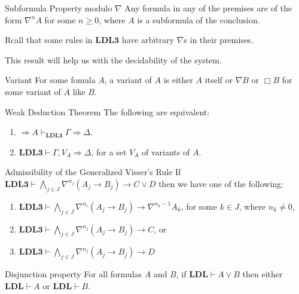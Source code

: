\documentclass[handout]{beamer}
\begin{document}
\begin{frame}{\subResults}
	\begin{exampleblock}{Subformula Property modulo $\nabla$}
		Any formula in any of the premises are of the form $\nabla^n A$ for some $n \geq 0$, where $A$ is a subformula of the conclusion.
	\end{exampleblock}
	\vspace{15mm}
	Rcall that some rules in $\mathbf{LDL3}$ have arbitrary $\nabla$s in their premises.
	
	This result will help us with the decidability of the system.
\end{frame}

\begin{frame}{\subResults}
	\begin{block}{Variant}
		For some fomula $A$, a variant of $A$ is either $A$ itself or $\nabla B$ or $\Box B$ for some variant of $A$ like $B$.
	\end{block}
	\begin{exampleblock}{Weak Deduction Theorem}
		The following are equivalent:
		\begin{enumerate}
			\item $\Rightarrow A \vdash_\mathbf{LDL3} \Gamma \Rightarrow \Delta$.
			\item $\mathbf{LDL3} \vdash \Gamma, V_A \Rightarrow \Delta$, for a set $V_A$ of variants of $A$.
		\end{enumerate}
	\end{exampleblock}
\end{frame}

\begin{frame}{\subResults}
	\begin{exampleblock}{Admissibility of the Generalized Visser's Rule}
		If $\mathbf{LDL3} \vdash \bigwedge_{j \in J} \nabla^{n_j} (A_j \rightarrow B_j) \rightarrow C \vee D$ then we have one of the following:
    \begin{enumerate}
      \item $\mathbf{LDL3} \vdash \bigwedge_{j \in J} \nabla^{n_i} (A_j \rightarrow B_j) \rightarrow \nabla^{n_k - 1} A_k$, {\small for some $k \in J$, where $n_k \neq 0$},
      \item $\mathbf{LDL3} \vdash \bigwedge_{j \in J} \nabla^{n_j} (A_j \rightarrow B_j) \rightarrow C$, or
      \item $\mathbf{LDL3} \vdash \bigwedge_{j \in J} \nabla^{n_j} (A_j \rightarrow B_j) \rightarrow D$
    \end{enumerate}
	\end{exampleblock}
	\begin{exampleblock}{Disjunction property}
		For all formulas $A$ and $B$, if $\mathbf{LDL} \vdash A \vee B$ then either $\mathbf{LDL} \vdash A$ or $\mathbf{LDL} \vdash B$.
	\end{exampleblock}
\end{frame}
\end{document}
